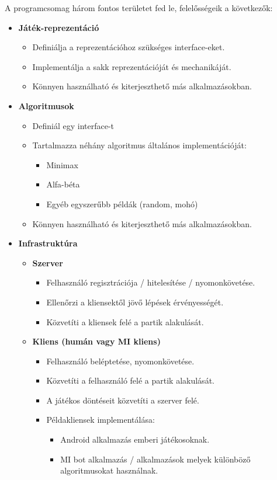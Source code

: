 \documentclass[twoside, a4paper, 12pt]{article}
\begin{document}
A programcsomag három fontos területet fed le, felelősségeik a következők:

\begin{itemize}
	
	\item \textbf{Játék-reprezentáció}
	\begin{itemize}
		\item Definiálja a reprezentációhoz szükséges interface-eket.
		\item Implementálja a sakk reprezentációját és mechanikáját.
		\item Könnyen használható és kiterjeszthető más alkalmazásokban.
	\end{itemize}

	\item \textbf{Algoritmusok}
	\begin{itemize}
		\item Definiál egy interface-t
		\item Tartalmazza néhány algoritmus általános implementációját:
		\begin{itemize}
			\item Minimax
			\item Alfa-béta
			\item Egyéb egyszerűbb példák (random, mohó)
		\end{itemize}
		\item Könnyen használható és kiterjeszthető más alkalmazásokban.
	\end{itemize}

	\item \textbf{Infrastruktúra}
	\begin{itemize}
		
		\item \textbf{Szerver}
		\begin{itemize}
			\item Felhasználó regisztrációja / hitelesítése / nyomonkövetése.
			\item Ellenőrzi a kliensektől jövő lépések érvényességét.
			\item Közvetíti a kliensek felé a partik alakulását.
		\end{itemize}
	
		\item \textbf{Kliens (humán vagy MI kliens)}
		\begin{itemize}
			\item Felhasználó beléptetése, nyomonkövetése.
			\item Közvetíti a felhasználó felé a partik alakulását.
			\item A játékos döntéseit közvetíti a szerver felé.
			\item Példakliensek implementálása:
			\begin{itemize}
				\item Android alkalmazás emberi játékosoknak.
				\item MI bot alkalmazás / alkalmazások melyek különböző algoritmusokat használnak.
			\end{itemize}
		\end{itemize}
	\end{itemize}
\end{itemize}
\end{document}
